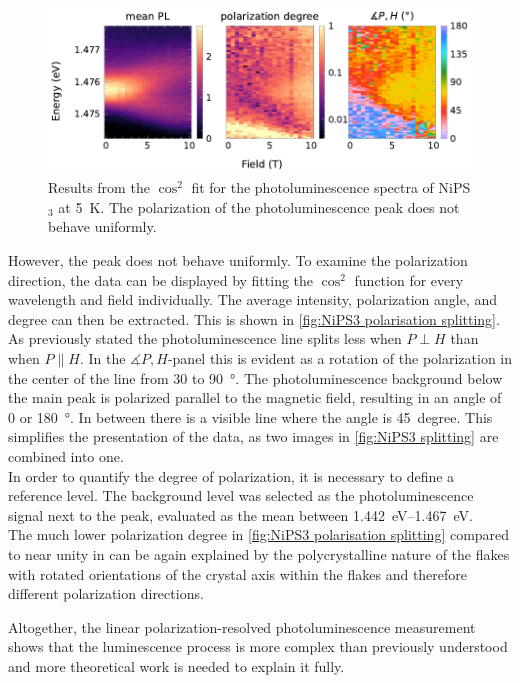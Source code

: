 \documentclass[
	twoside,
	parskip=half,
	a4paper,
]{scrbook}
\begin{document}
\begin{figure}
	\centering
	\includegraphics{../figures/2024-04-09 NiPS3 polarisation Splitting.pdf}
	\caption{Results from the $\cos^2$ fit for the photoluminescence spectra of NiPS$_3$ at \SI{5}{K}. The polarization of the photoluminescence peak does not behave uniformly.}
	\label{fig:NiPS3 polarisation splitting}
\end{figure}
However, the peak does not behave uniformly.
To examine the polarization direction, the data can be displayed by fitting the $\cos^2$ function for every wavelength and field individually.
The average intensity, polarization angle, and degree can then be extracted.
This is shown in \autoref{fig:NiPS3 polarisation splitting}.\\
As previously stated the photoluminescence line splits less when $P\perp H$ than when $P\parallel H$.
In the $\measuredangle P, H$-panel this is evident as a rotation of the polarization in the center of the line from $30$ to \SI{90}{\degree}.
The photoluminescence background below the main peak is polarized parallel to the magnetic field, resulting in an angle of $0$ or \SI{180}{\degree}.
In between there is a visible line where the angle is \SI{45}{degree}.
This simplifies the presentation of the data, as two images in \autoref{fig:NiPS3 splitting} are combined into one.\\
In order to quantify the degree of polarization, it is necessary to define a reference level.
The background level was selected as the photoluminescence signal next to the peak, evaluated as the mean between \SIrange{1.442}{1.467}{eV}.\\
The much lower polarization degree in \autoref{fig:NiPS3 polarisation splitting} compared to near unity in \cite{NiPS3_anisotropic} can be again explained by the polycrystalline nature of the flakes with rotated orientations of the crystal axis within the flakes and therefore different polarization directions.

Altogether, the linear polarization-resolved photoluminescence measurement shows that the luminescence process is more complex than previously understood \cite{NiPS3_coherent,NiPS3_magnon_gap} and more theoretical work is needed to explain it fully.
\end{document}
